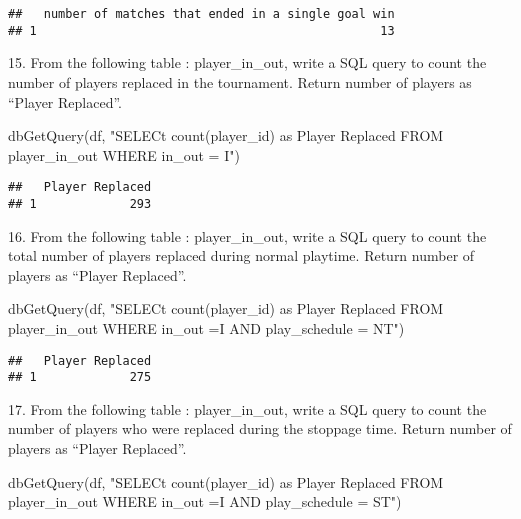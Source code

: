 \documentclass[
]{article}
\newenvironment{Shaded}{\begin{snugshade}}{\end{snugshade}}
\newcommand{\FunctionTok}[1]{\textcolor[rgb]{0.00,0.00,0.00}{#1}}
\newcommand{\NormalTok}[1]{#1}
\newcommand{\StringTok}[1]{\textcolor[rgb]{0.31,0.60,0.02}{#1}}
\begin{document}
\begin{verbatim}
##   number of matches that ended in a single goal win
## 1                                                13
\end{verbatim}

15. From the following table : player\_in\_out, write a SQL query to
count the number of players replaced in the tournament. Return number of
players as ``Player Replaced''.

\begin{Shaded}
\begin{Highlighting}[]
\FunctionTok{dbGetQuery}\NormalTok{(df, }\StringTok{"SELECt count(player\_id) as \textquotesingle{}Player Replaced\textquotesingle{}}
\StringTok{                FROM player\_in\_out}
\StringTok{                WHERE in\_out = \textquotesingle{}I\textquotesingle{}"}\NormalTok{)}
\end{Highlighting}
\end{Shaded}

\begin{verbatim}
##   Player Replaced
## 1             293
\end{verbatim}

16. From the following table : player\_in\_out, write a SQL query to
count the total number of players replaced during normal playtime.
Return number of players as ``Player Replaced''.

\begin{Shaded}
\begin{Highlighting}[]
\FunctionTok{dbGetQuery}\NormalTok{(df, }\StringTok{"SELECt  count(player\_id) as \textquotesingle{}Player Replaced\textquotesingle{}}
\StringTok{                FROM player\_in\_out}
\StringTok{                WHERE in\_out =\textquotesingle{}I\textquotesingle{} AND play\_schedule = \textquotesingle{}NT\textquotesingle{}"}\NormalTok{)}
\end{Highlighting}
\end{Shaded}

\begin{verbatim}
##   Player Replaced
## 1             275
\end{verbatim}

17. From the following table : player\_in\_out, write a SQL query to
count the number of players who were replaced during the stoppage time.
Return number of players as ``Player Replaced''.

\begin{Shaded}
\begin{Highlighting}[]
\FunctionTok{dbGetQuery}\NormalTok{(df, }\StringTok{"SELECt  count(player\_id) as \textquotesingle{}Player Replaced\textquotesingle{}}
\StringTok{                FROM player\_in\_out}
\StringTok{                WHERE in\_out =\textquotesingle{}I\textquotesingle{} AND play\_schedule = \textquotesingle{}ST\textquotesingle{}"}\NormalTok{)}
\end{Highlighting}
\end{Shaded}
\end{document}
